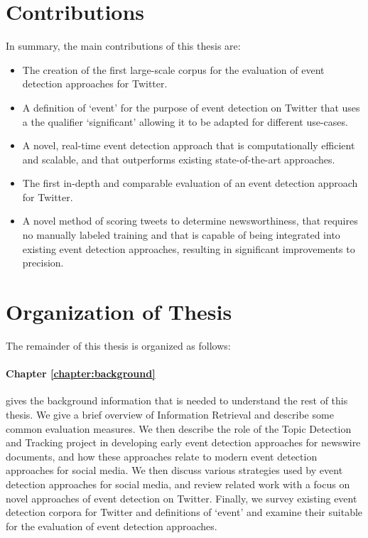 \section{Contributions}
In summary, the main contributions of this thesis are:

\begin{itemize}
	\item The creation of the first large-scale corpus for the evaluation of event detection approaches for Twitter.

	\item A definition of `event' for the purpose of event detection on Twitter that uses a the qualifier `significant' allowing it to be adapted for different use-cases.

	\item A novel, real-time event detection approach that is computationally efficient and scalable, and that outperforms existing state-of-the-art approaches.

	\item The first in-depth and comparable evaluation of an event detection approach for Twitter.

	\item A novel method of scoring tweets to determine newsworthiness, that requires no manually labeled training and that is capable of being integrated into existing event detection approaches, resulting in significant improvements to precision.
\end{itemize}

\newpage
\section{Organization of Thesis}

The remainder of this thesis is organized as follows:

\paragraph{Chapter \ref{chapter:background}} gives the background information that is needed to understand the rest of this thesis.
We give a brief overview of Information Retrieval and describe some common evaluation measures.
We then describe the role of the Topic Detection and Tracking project in developing early event detection approaches for newswire documents, and how these approaches relate to modern event detection approaches for social media. We then discuss various strategies used by event detection approaches for social media, and review related work with a focus on novel approaches of event detection on Twitter.
Finally, we survey existing event detection corpora for Twitter and definitions of `event' and examine their suitable for the evaluation of event detection approaches.

